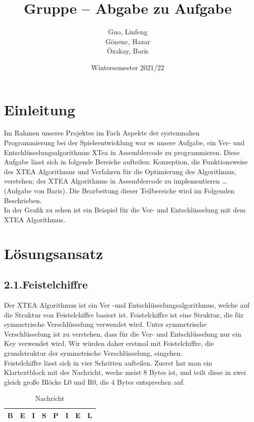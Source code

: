 \documentclass[course=asp]{aspdoc}
\author{Guo, Linfeng\\Gönenc, Hazar \\Özakay, Baris}
\date{Wintersemester 2021/22}
\title{Gruppe \theGroup{} -- Abgabe zu Aufgabe \theNumber}
\begin{document}
\maketitle



\section{Einleitung}
Im Rahmen unseres Projektes im Fach Aspekte der systemnahen Programmierung bei der Spieleentwicklung war es unsere Aufgabe, ein Ver- und Entschlüsselungsalgorithmus XTea in Assemblercode zu programmieren. Diese Aufgabe lässt sich in folgende Bereiche aufteilen: Konzeption, die Funktionsweise des XTEA Algorithmus und Verfahren für die Optimierung des Algorithmus, verstehen; der XTEA Algorithmus in Assemblercode zu implementieren …(Aufgabe von Baris). Die Bearbeitung dieser Teilbereiche wird im Folgenden Beschrieben.  \\In der Grafik zu sehen ist ein Beispiel für die Ver- und Entschlüsselung mit dem XTEA Algorithmus.

\newpage
\section{Lösungsansatz}
\subsection*{2.1.Feistelchiffre }
Der XTEA Algorithmus ist ein Ver -und Entschlüsselungsalgorithmus, welche auf die Struktur von Feistelchiffre basiert ist. Feistelchiffre ist eine Struktur, die für symmetrische Verschlüsselung verwendet wird. Unter symmetrische Verschlüsselung ist zu verstehen, dass für die Ver- und Entschlüsselung nur ein Key verwendet wird. Wir würden daher erstmal mit Feistelchiffre, die grundstruktur der symmetrische Verschlüsselung, eingehen.\\
Feistelchiffre lässt sich in vier Schritten aufteilen. Zuerst hat man ein Klartextblock mit der Nachricht, weche meist 8 Bytes ist, und teilt diese in zwei gleich große Bl\"ocke L0 und R0, die 4 Bytes entsprechen auf.

\begin{table}[H]
\centering
    \begin{tabular}{|l|l|l|l|l|l|l|l|}
        \hline
        B & E & I & S & P & I & E & L   \\
        \hline
    \end{tabular}
    \caption{Nachricht}
\end{table}
\end{document}
